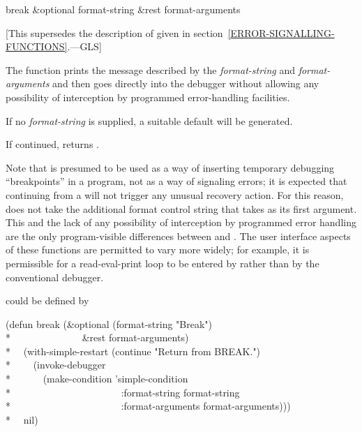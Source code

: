 \begin{defun}[Function]
break &optional format-string &rest format-arguments

   [This supersedes the description of 
   given in section~\ref{ERROR-SIGNALLING-FUNCTIONS}.---GLS]

  The function  prints the message described by the
  {\it format-string} and {\it format-arguments} and then
  goes directly into the debugger without allowing any possibility of
  interception by programmed error-handling facilities.

  If no {\it format-string} is supplied, a suitable default will be generated.

  If continued,  returns .

  Note that  is presumed to be used as a way of inserting temporary debugging
  ``breakpoints'' in a program, not as a way of signaling errors; it is
  expected that continuing from a  will not trigger any unusual recovery
  action. For this reason,  does not take the additional format control
  string that  takes as its first argument. This and the lack of any
  possibility of interception by programmed error handling are the only
  program-visible differences between  and . The user interface
  aspects of these functions are permitted to vary more widely; for example,
  it is permissible for a read-eval-print loop to be entered by  rather
  than by the conventional debugger.

   could be defined by
\begin{lisp}
(defun break (\&optional (format-string "Break") \\*
~~~~~~~~~~~~~~\&rest format-arguments) \\*
~~(with-simple-restart (continue "Return from BREAK.") \\*
~~~~(invoke-debugger \\*
~~~~~~(make-condition 'simple-condition \\*
~~~~~~~~~~~~~~~~~~~~~~:format-string format-string \\*
~~~~~~~~~~~~~~~~~~~~~~:format-arguments format-arguments))) \\*
~~nil)
\end{lisp}
\end{defun}

